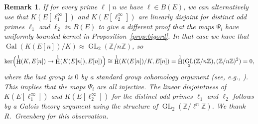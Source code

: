 \documentclass{oupau}
\DeclareMathOperator{\Gal}{Gal}
\DeclareMathOperator{\GL}{GL}
\DeclareMathOperator{\HH}{H}
\renewcommand{\H}{\HH}
\newcommand{\isom}{\cong}
\newcommand{\ZZ}{\mathbb{Z}}
\newcommand{\ncisom}{\approx}   %
\newtheorem{remark}[theorem]{Remark}
\begin{document}
\begin{remark}\label{rmk:otherarg}
  If for every prime $\ell\mid n$ we have $\ell \in B(E)$, we can
  alternatively use that $K(E[\ell_1^{\infty}])$ and
  $K(E[\ell_2^{\infty}])$ are linearly disjoint for distinct odd
  primes $\ell_1$ and $\ell_2$ in $B(E)$ to give a different proof that
  the maps $\Psi_i$ have uniformly bounded kernel in
  Proposition~\ref{prop:bigord}.  In that case we have that
  $\Gal(K(E[n])/K) \ncisom \GL_2(\ZZ/n\ZZ)$, so
$$
  \ker\Bigl(\H^1(K,E[n]) \to \H^1(K(E[n]),E[n])\Bigr) \isom 
   \H^1(K(E[n])/K, E[n]) = \H^1(\GL_2(\ZZ/n\ZZ), (\ZZ/n\ZZ)^2) = 0,
$$
where the last group is $0$ by a standard group cohomology argument
(see, e.g., \cite[\S5.1]{stein:index}).  This implies that the maps
$\Psi_i$ are all injective.  The linear disjointness of
$K(E[\ell_1^{\infty}])$ and $K(E[\ell_2^{\infty}])$ for the distinct
{\em odd} primes $\ell_1$ and $\ell_2$ follows by a Galois theory
argument using the structure of $\GL_2(\ZZ/\ell^n\ZZ)$.  We 
thank R.~Greenberg for this observation.



\end{remark}
\end{document}
